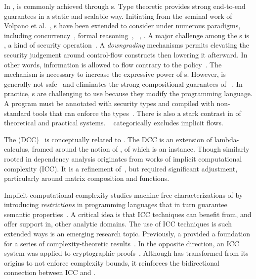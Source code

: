 In ,  is commonly achieved
through s. Type theoretic 
provides strong end-to-end  guarantees in a static and
scalable way. Initiating from the seminal work of Volpano et
al.~\cite{volpano1996}, s have been extended to
consider  under numerous paradigms, including
concurrency~\cite{volpano1998,derakhshan2024,frumin2021}, formal reasoning~\cite{nelson2020,frumin2021}, ~\cite{barthe2004}, \etc. A major challenge among the s is \emph{}, a kind of security
 operation~\cite{cecchetti2017}. A \emph{downgrading}
mechanisms permits elevating the security judgement around control-flow
constructs then lowering it afterward. In other words, information is allowed to
flow contrary to the policy~\cite{cecchetti2017}. The mechanism is necessary to
increase the expressive power of s. However,  is generally not safe~\cite{derakhshan2024}
and eliminates the strong compositional guarantees of
~\cite{cecchetti2017}. In practice, s are challenging to use because they modify the programming language. A
program must be annotated with security types and compiled with non-standard
tools that can enforce the types~\cite{lamba2024}. There is also a stark
contrast in  of theoretical and practical systems.
\Eg~\cite{huang2014} categorically excludes implicit flows.

The  (DCC)~\cite{abadi1999b} is conceptually
related to \lname. The DCC is an extension of
lambda-calculus, framed around the notion of
, of which  is an instance. Though
similarly rooted in dependency analysis \lname
originates from works of implicit computational complexity (ICC). It is a
refinement of~\cite{moyen20172,aubert20232}, but \lname required significant
adjustment, particularly around matrix composition and functions.

Implicit computational complexity studies machine-free characterizations of
 by introducing \emph{restrictions} in programming
languages that in turn guarantee semantic properties~\cite{dallago2011}. A
critical idea is that ICC techniques can benefit from, and offer support in,
other analytic domains. The use of ICC techniques is such extended ways is an
emerging research topic. Previously, a   provided a foundation for a series of
complexity-theoretic results~\cite{marion2011,hainry2023}. In the opposite
direction, an ICC system was applied to cryptographic
proofs~\cite{baillot2019}. Although \lname has transformed from its origins to
not enforce complexity bounds, it reinforces the bidirectional connection
between ICC and .

